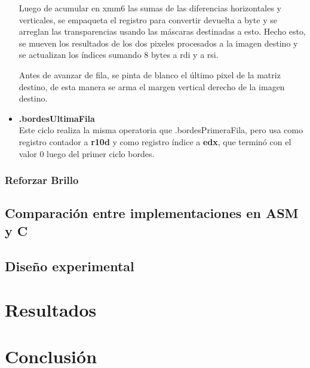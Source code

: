 \documentclass[a4paper]{article}
\begin{document}
\begin{itemize}
	Luego de acumular en xmm6 las sumas de las diferencias horizontales y verticales, se empaqueta el registro para convertir devuelta a byte y se arreglan las transparencias usando las máscaras destinadas a esto. Hecho esto, se mueven los resultados de los dos pixeles procesados a la imagen destino y se actualizan los índices sumando 8 bytes a rdi y a rsi.
	
	Antes de avanzar de fila, se pinta de blanco el último pixel de la matriz destino, de esta manera se arma el margen vertical derecho de la imagen destino.
	\item \textbf{.bordesUltimaFila}\\
	Este ciclo realiza la misma operatoria que .bordesPrimeraFila, pero usa como registro contador a \textbf{r10d} y como registro índice a \textbf{edx}, que terminó con el valor 0 luego del primer ciclo bordes.
\end{itemize}
	



   
\subsubsection{Reforzar Brillo}


\subsection{Comparación entre implementaciones en ASM y C}

\subsection{Diseño experimental}



\section{Resultados}
%

\section{Conclusión}
\end{document}
